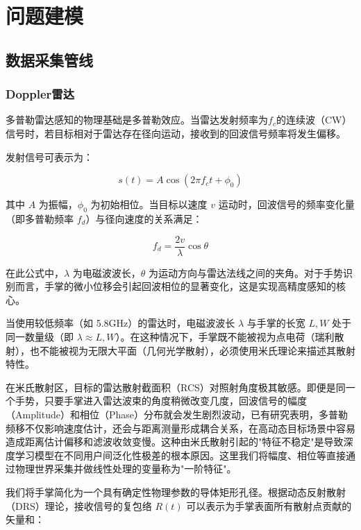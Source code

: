 \section{问题建模}

\subsection{数据采集管线}

\subsubsection{Doppler雷达}

多普勒雷达感知的物理基础是多普勒效应。当雷达发射频率为$f_{c}$的连续波（CW）信号时，若目标相对于雷达存在径向运动，接收到的回波信号频率将发生偏移。

发射信号可表示为：

\begin{equation}
    s(t) = A\cos(2\pi f_{c}t + \phi_{0})
\end{equation}

其中 $A$ 为振幅，$\phi_{0}$ 为初始相位。当目标以速度 $v$ 运动时，回波信号的频率变化量（即多普勒频率 $f_{d}$）与径向速度的关系满足：

\begin{equation}
    f_{d} = \frac{2v}{\lambda}\cos\theta
\end{equation}

在此公式中，$\lambda$ 为电磁波波长，$\theta$ 为运动方向与雷达法线之间的夹角。对于手势识别而言，手掌的微小位移会引起回波相位的显著变化，这是实现高精度感知的核心。

当使用较低频率（如 5.8GHz）的雷达时，电磁波波长 $\lambda$ 与手掌的长宽 $L, W$ 处于同一数量级（即 $\lambda \approx L, W$）。在这种情况下，手掌既不能被视为点电荷（瑞利散射），也不能被视为无限大平面（几何光学散射），必须使用米氏理论来描述其散射特性。

在米氏散射区，目标的雷达散射截面积（RCS）对照射角度极其敏感。即便是同一个手势，只要手掌进入雷达波束的角度稍微改变几度，回波信号的幅度（Amplitude）和相位（Phase）分布就会发生剧烈波动，已有研究表明，多普勒频移不仅影响速度估计，还会与距离测量形成耦合关系，在高动态目标场景中容易造成距离估计偏移和滤波收敛变慢\cite{yu2026dopplerrange}。这种由米氏散射引起的"特征不稳定"是导致深度学习模型在不同用户间泛化性极差的根本原因。这里我们将幅度、相位等直接通过物理世界采集并做线性处理的变量称为"一阶特征"。

我们将手掌简化为一个具有确定性物理参数的导体矩形孔径。根据动态反射散射（DRS）理论，接收信号的复包络 $R(t)$ 可以表示为手掌表面所有散射点贡献的矢量和：

